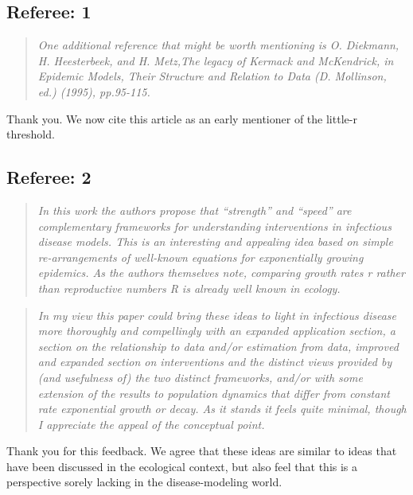 \newcommand{\RR}{\ensuremath{{\mathcal R}}}
\newcommand{\Rhat}{\ensuremath{{\hat\RR}}}
\newcommand{\rr}{\ensuremath{{r}}}

\hypertarget{referee-1}{%
\subsection{Referee: 1}\label{referee-1}}

\begin{quote}\sl
One additional reference that might be worth mentioning is O. Diekmann,
H. Heesterbeek, and H. Metz,The legacy of Kermack and McKendrick, in
Epidemic Models, Their Structure and Relation to Data (D. Mollinson,
ed.) (1995), pp.95-115.
\end{quote}

Thank you. We now cite this article as an early mentioner of the
little-r threshold.

\hypertarget{referee-2}{%
\subsection{Referee: 2}\label{referee-2}}

\begin{quote}\sl
In this work the authors propose that ``strength'' and ``speed'' are
complementary frameworks for understanding interventions in infectious
disease models. This is an interesting and appealing idea based on
simple re-arrangements of well-known equations for exponentially growing
epidemics. As the authors themselves note, comparing growth rates r
rather than reproductive numbers R is already well known in ecology.
\end{quote}

\begin{quote}\sl
In my view this paper could bring these ideas to light in infectious
disease more thoroughly and compellingly with an expanded application
section, a section on the relationship to data and/or estimation from
data, improved and expanded section on interventions and the distinct
views provided by (and usefulness of) the two distinct frameworks,
and/or with some extension of the results to population dynamics that
differ from constant rate exponential growth or decay. As it stands it
feels quite minimal, though I appreciate the appeal of the conceptual
point.
\end{quote}

Thank you for this feedback. We agree that these ideas are similar to
ideas that have been discussed in the ecological context, but also feel
that this is a perspective sorely lacking in the disease-modeling world.

